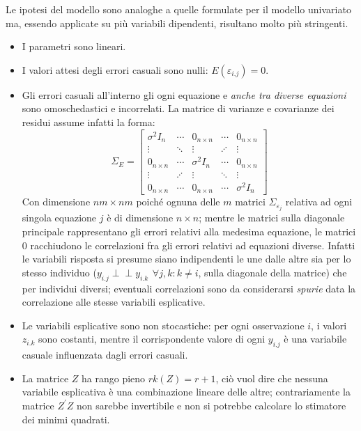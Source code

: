 \documentclass[a4page, 11pt]{article} %
\def\indep{\perp \!\!\! \perp }   %
\begin{document}
Le ipotesi del modello sono analoghe a quelle formulate per il modello univariato ma, essendo applicate su più variabili dipendenti, risultano molto più stringenti.
\begin{itemize}[noitemsep]
\item I parametri sono lineari.
\item I valori attesi degli errori casuali sono nulli: $E(\varepsilon_{i.j}) = 0$.
\item Gli errori casuali all’interno gli ogni equazione e \textit{anche tra diverse equazioni} sono omoschedastici e incorrelati.
  La matrice di varianze e covarianze dei residui assume infatti la forma:
\begin{equation*}
  \Sigma_E =
  \begin{bmatrix}
    \sigma^2 I_n   & \cdots  & 0_{n \times n} & \cdots  & 0_{n \times n} \\
    \vdots         & \ddots  & \vdots         & \iddots & \vdots \\
    0_{n \times n} & \cdots  & \sigma^2 I_n   & \cdots  & 0_{n \times n} \\
    \vdots         & \iddots & \vdots         & \ddots  & \vdots \\
    0_{n \times n} & \cdots  & 0_{n \times n} & \cdots  & \sigma^2 I_n 
  \end{bmatrix}
\end{equation*}
Con dimensione $nm \times nm$ poiché ognuna delle $m$ matrici $\Sigma_{\varepsilon_j}$ relativa ad ogni singola equazione $j$ è di dimensione $n \times n$; mentre le matrici sulla diagonale principale rappresentano gli errori relativi alla medesima equazione, le matrici $0$ racchiudono le correlazioni fra gli errori relativi ad equazioni diverse.
Infatti le variabili risposta si presume siano indipendenti le une dalle altre sia per lo stesso individuo ($y_{i.j} \indep y_{i.k} \hspace{5pt} \forall j, k : k \ne i$, sulla diagonale della matrice) che per individui diversi; eventuali correlazioni sono da considerarsi \textit{spurie} data la correlazione alle stesse variabili esplicative.
\item Le  variabili esplicative sono non stocastiche: per ogni osservazione $i$, i valori $z_{i.k}$ sono costanti, mentre il corrispondente valore di ogni $y_{i.j}$ è una variabile casuale influenzata dagli errori casuali.
\item La matrice $Z$ ha rango pieno $rk(Z) = r + 1$, ciò vuol dire che nessuna variabile esplicativa è una combinazione lineare delle altre; contrariamente la matrice $Z^{\prime}Z$ non sarebbe invertibile e non si potrebbe calcolare lo stimatore dei minimi quadrati.

\end{itemize}
\end{document}
